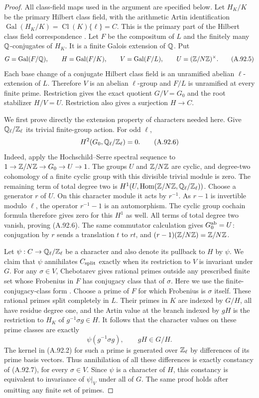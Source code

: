 \begin{proof}
All class-field maps used in the argument are specified below.
Let $H_K/K$ be the primary Hilbert class field, with the arithmetic
Artin identification
$\operatorname{Gal}(H_K/K)=\operatorname{Cl}(K)\{\ell\}=C$.
This is the primary part of the Hilbert class field correspondence
\cite[V, Theorems 3.5--3.6 and Example 3.9]{MilneCFT}.
Let $F$ be the compositum of $L$ and the finitely many
$\mathbb Q$-conjugates of $H_K$.  It is a finite Galois extension of
$\mathbb Q$.  Put
\[
 G=\operatorname{Gal}(F/\mathbb Q),\qquad
 H=\operatorname{Gal}(F/K),\qquad
 V=\operatorname{Gal}(F/L),\qquad U=(\mathbb Z/N\mathbb Z)^\times.
 \tag{A.92.5}
\]
Each base change of a conjugate Hilbert class field is an
unramified abelian $\ell$-extension of $L$.  Therefore $V$ is
an abelian $\ell$-group and $F/L$ is unramified at every finite
prime.  Restriction gives the exact quotient $G/V=G_0$ and
the root stabilizer $H/V=U$.  Restriction also gives a
surjection $H\to C$.

We first prove directly the extension property of characters
needed here.  Give $\mathbb Q_\ell/\mathbb Z_\ell$ its trivial finite-group
action.  For odd $\ell$,
\[
                  H^2(G_0,\mathbb Q_\ell/\mathbb Z_\ell)=0.
 \tag{A.92.6}
\]
Indeed, apply the Hochschild--Serre spectral sequence to
$1\to\mathbb Z/N\mathbb Z\to G_0\to U\to1$.
The groups $U$ and $\mathbb Z/N\mathbb Z$ are cyclic, and degree-two
cohomology of a finite cyclic group with this divisible
trivial module is zero.  The remaining term of total degree
two is
$H^1(U,\operatorname{Hom}(\mathbb Z/N\mathbb Z,\mathbb Q_\ell/\mathbb Z_\ell))$.
Choose a generator $r$ of $U$.  On this character module it
acts by $r^{-1}$.  As $r-1$ is invertible modulo $\ell$, the
operator $r^{-1}-1$ is an automorphism.  The cyclic group
cochain formula therefore gives zero for this $H^1$ as well.
All terms of total degree two vanish, proving (A.92.6).
The same commutator calculation gives
$G_0^{\rm ab}=U$: conjugation by $r$ sends a translation
$t$ to $rt$, and $(r-1)(\mathbb Z/N\mathbb Z)=\mathbb Z/N\mathbb Z$.

Let $\psi:C\to\mathbb Q_\ell/\mathbb Z_\ell$ be a character and also denote
its pullback to $H$ by $\psi$.
We claim that $\psi$ annihilates $C_{\rm split}$ exactly when
its restriction to $V$ is invariant under $G$.
For any $\sigma\in V$, Chebotarev gives rational primes
outside any prescribed finite set whose Frobenius in $F$
has conjugacy class that of $\sigma$.
Here we use the finite-conjugacy-class form
\cite[Theorem 8.31]{AgentMilneANT}.
Choose a prime of $F$ for which Frobenius is $\sigma$ itself.
These rational primes split completely in $L$.
Their primes in $K$ are indexed by $G/H$, all have residue
degree one, and the Artin value at the branch indexed by
$gH$ is the restriction to $H_K$ of $g^{-1}\sigma g\in H$.
It follows that the character values on these prime classes
are exactly
\[
                         \psi(g^{-1}\sigma g),\qquad gH\in G/H.
 \tag{A.92.7}
\]
The kernel in (A.92.2) for such a prime is generated over
$\mathbb Z_\ell$ by differences of its prime basis vectors.
Thus annihilation of all these differences is exactly
constancy of (A.92.7), for every $\sigma\in V$.
Since $\psi$ is a character of $H$, this constancy is
equivalent to invariance of $\psi|_V$ under all of $G$.
The same proof holds after omitting any finite set of primes.


\end{proof}
